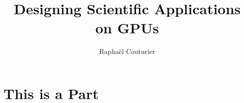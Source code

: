 \documentclass[sunil1,ChapterTOCs]{sunil}
\begin{document}
\bibliographyunit[\chapter]



\title{Designing Scientific Applications on GPUs }

\author{Raphaël Couturier}

\maketitle

\frontmatter



\listoffigures
\listoftables
\tableofcontents

\mainmatter



\setcounter{page}{1}
\part{This is a Part}
%
%





\clearpage
\printindex
\end{document}
